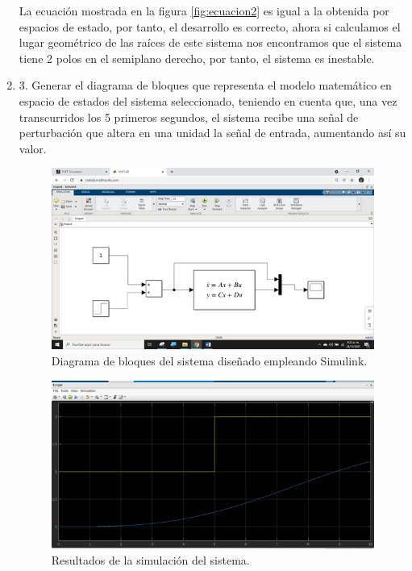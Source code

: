 \documentclass{article}
\begin{document}
\begin{enumerate}
La ecuación mostrada en la figura \ref{fig:ecuacion2} es igual a la obtenida por espacios de estado, por tanto, el desarrollo es correcto, ahora si calculamos el lugar geométrico de las raíces de este sistema nos encontramos que el sistema tiene 2 polos en el semiplano derecho, por tanto, el sistema es inestable. 

\item 3.  Generar el diagrama de bloques que representa el modelo matemático en espacio de estados del sistema seleccionado, teniendo en cuenta que, una vez transcurridos los 5 primeros segundos, el sistema recibe una señal de perturbación que altera en una unidad la señal de entrada, aumentando así su valor.

\begin{figure}
  \centering
  \includegraphics[width=14cm]{img/bloques.png}
  \caption{Diagrama de bloques del sistema diseñado empleando Simulink.}
  \label{fig:diagramabloques}
\end{figure}

\begin{figure}
  \centering
  \includegraphics[width=14cm]{img/simulacion.png}
  \caption{Resultados de la simulación del sistema.}
  \label{fig:simulacion}
\end{figure}


\end{enumerate}
\end{document}
